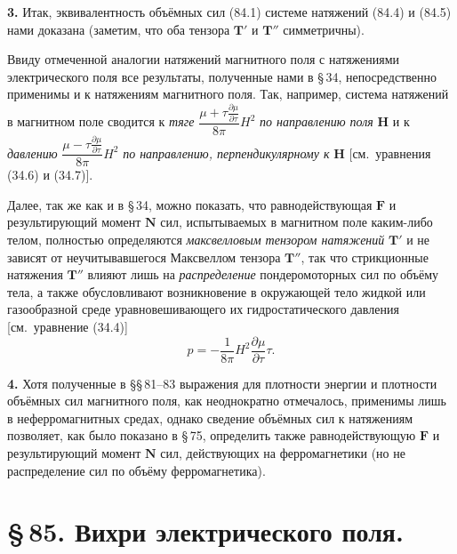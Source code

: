 \documentclass[a4paper,12pt]{article}
\begin{document}
\textbf{3.} Итак, эквивалентность объёмных сил (84.1) системе натяжений
(84.4) и (84.5) нами доказана (заметим, что оба тензора $\mathbf{T}'$ и
$\mathbf{T}''$ симметричны).

Ввиду отмеченной аналогии натяжений магнитного поля с натяжениями
электрического поля все результаты, полученные нами в §\,34, непосредственно
применимы и к натяжениям магнитного поля. Так, например, система натяжений
в магнитном поле сводится к \textit{тяге}
$\dfrac{\mu + \tau\frac{\partial\mu}{\partial\tau}}{8\pi}H^2$
\textit{по направлению поля} $\mathbf{H}$ и к \textit{давлению}
$\dfrac{\mu - \tau\frac{\partial\mu}{\partial\tau}}{8\pi}H^2$
\textit{по направлению, перпендикулярному к} $\mathbf{H}$
[см.\ уравнения (34.6) и (34.7)].

Далее, так же как и в §\,34, можно показать, что равнодействующая
$\mathbf{F}$ и результирующий момент $\mathbf{N}$ сил, испытываемых
в магнитном поле каким-либо телом, полностью определяются
\textit{максвелловым тензором натяжений} $\mathbf{T}'$ и не зависят от
неучитывавшегося Максвеллом тензора $\mathbf{T}''$, так что стрикционные
натяжения $\mathbf{T}''$ влияют лишь на \textit{распределение}
пондеромоторных сил по объёму тела, а также обусловливают возникновение
в окружающей тело жидкой или газообразной среде уравновешивающего их
гидростатического давления [см.\ уравнение (34.4)]
\begin{equation}
    p = -\frac{1}{8\pi}H^2\frac{\partial\mu}{\partial\tau}\tau.
    \tag{84.6}
\end{equation}


\textbf{4.} Хотя полученные в §§\,81–83 выражения для плотности энергии
и плотности объёмных сил магнитного поля, как неоднократно отмечалось,
применимы лишь в неферромагнитных средах, однако сведение объёмных сил
к натяжениям позволяет, как было показано в §\,75, определить также
равнодействующую $\mathbf{F}$ и результирующий момент $\mathbf{N}$ сил,
действующих на ферромагнетики (но не распределение сил по объёму
ферромагнетика).


\section*{\S\,85. Вихри электрического поля.}
\end{document}
